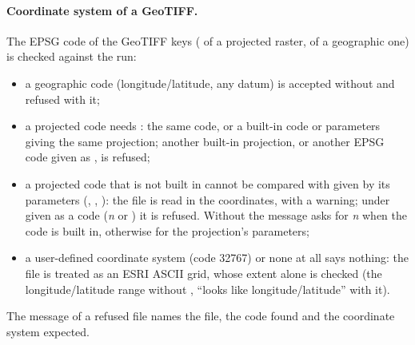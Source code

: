 \paragraph{Coordinate system of a GeoTIFF.} The EPSG code of the GeoTIFF keys ( of a projected
raster,  of a geographic one) is checked against the run:
\begin{itemize}
\item a geographic code (longitude/latitude, any datum) is accepted without  and refused with it;
\item a projected code needs : the same code, or a built-in code or parameters giving the same projection;
another built-in projection, or another EPSG code given as , is refused;
\item a projected code that is not built in cannot be compared with  given by its parameters (,
, ): the file is read in the  coordinates, with a warning; under 
given as a code (\emph{n} or ) it is refused. Without  the message asks for
\emph{n} when the code is built in, otherwise for the projection's parameters;
\item a user-defined coordinate system (code 32767) or none at all says nothing: the file is treated as an ESRI ASCII grid,
whose extent alone is checked (the longitude/latitude range without , ``looks like longitude/latitude''
with it).
\end{itemize}
The message of a refused file names the file, the code found and the coordinate system expected.

